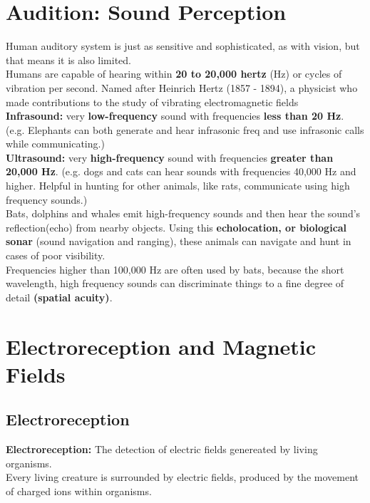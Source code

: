 \documentclass{article}
\begin{document}
\section{Audition: Sound Perception}
Human auditory system is just as sensitive and sophisticated, as with vision, but that means it is also limited. \\

Humans are capable of hearing within \textbf{20 to 20,000 hertz} (Hz) or cycles of vibration per second. Named after Heinrich Hertz (1857 - 1894), a physicist who made contributions to the study of vibrating electromagnetic fields \\

\noindent \textbf{Infrasound:} very \textbf{low-frequency} sound with frequencies \textbf{less than 20 Hz}.
(e.g. Elephants can both generate and hear infrasonic freq and use infrasonic calls while communicating.)\\

\noindent \textbf{Ultrasound:} very \textbf{high-frequency} sound with frequencies \textbf{greater than 20,000 Hz}. (e.g. dogs and cats can hear sounds with frequencies 40,000 Hz and higher. Helpful in hunting for other animals, like rats, communicate using high frequency sounds.) \\

Bats, dolphins and whales emit high-frequency sounds and then hear the sound's reflection(echo) from nearby objects. Using this \textbf{echolocation, or biological sonar} (sound navigation and ranging), these animals can navigate and hunt in cases of poor visibility. \\
Frequencies higher than 100,000 Hz are often used by bats, because the short wavelength, high frequency sounds can discriminate things to a fine degree of detail \textbf{(spatial acuity)}. \\ 

\section{Electroreception and Magnetic Fields}

\subsection{Electroreception}
\textbf{Electroreception:} The detection of electric fields genereated by living organisms. \\

Every living creature is surrounded by electric fields, produced by the movement of charged ions within organisms. \\
\end{document}
